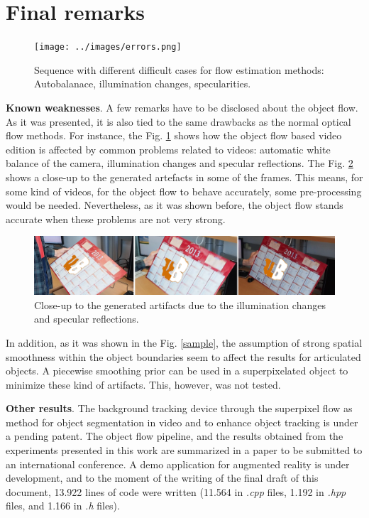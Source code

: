 \section{Final remarks} \label{sec:remarks}

   \begin{figure}[thpb]
      \centering
      \texttt{[image: ../images/errors.png]}
      \caption{ Sequence with different difficult cases for flow estimation methods: Autobalanace, illumination changes, specularities. }
      \label{of_errors}
   \end{figure}

\textbf{Known weaknesses}. A few remarks have to be disclosed about the object flow. As it was presented, it is also tied to the same drawbacks as the normal optical flow methods. 
For instance, the Fig. \ref{of_errors} shows how the object flow based video edition is affected by common problems related to videos: 
automatic white balance of the camera, illumination changes and specular reflections. The Fig. \ref{zoom_errors} shows a close-up to the generated 
artefacts in some of the frames. This means, for some kind of videos, for the object flow to behave accurately, some pre-processing would be needed. 
Nevertheless, as it was shown before, the object flow stands accurate when these problems are not very strong.

   \begin{figure}[thpb]
      \centering
      \includegraphics[width=1.00\textwidth]{../images/zoomerrors.png}
      \caption{Close-up to the generated artifacts due to the illumination changes and specular reflections. }
      \label{zoom_errors}
   \end{figure}

In addition, as it was shown in the Fig. \ref{sample}, the assumption of strong spatial smoothness within the object boundaries seem to affect the results 
for articulated objects. A piecewise smoothing prior can be used in a superpixelated object to minimize these kind of artifacts. This, however, was not tested.

\textbf{Other results}. The background tracking device through the superpixel flow as method 
for object segmentation in video and to enhance object tracking is under a pending patent.
The object flow pipeline, and the results obtained from the experiments 
presented in this work are summarized in a paper to be submitted to an international conference. 
A demo application for augmented reality is under development, and to the moment of 
the writing of the final draft of this document, 13.922 lines of code 
were written (11.564 in {\it .cpp} files, 
1.192 in {\it .hpp} files, and 1.166 in {\it .h} files).

